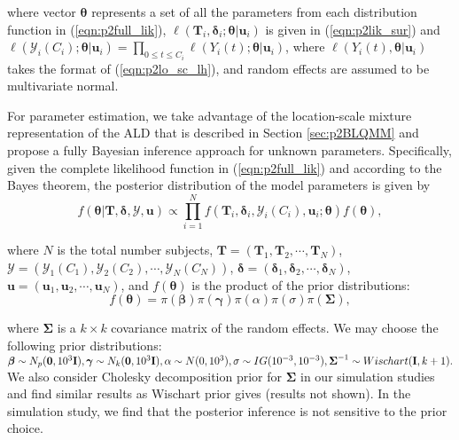 \noindent where vector $\boldsymbol{\theta}$ represents a set of all the parameters from each distribution function in (\ref{eqn:p2full_lik}),  $\ell(\boldsymbol{T}_i, \boldsymbol{\delta}_i; \boldsymbol{\theta}|\boldsymbol{u}_i)$ is given in (\ref{eqn:p2lik_sur}) and $\ell(\mathcal{Y}_{i}(C_i); \boldsymbol{\theta}|\boldsymbol{u}_i)=\prod_{0\le t\le C_i}\ell(Y_{i}(t); \boldsymbol{\theta}|\boldsymbol{u}_i)$, where $\ell(Y_{i}(t), \boldsymbol{\theta}|\boldsymbol{u}_i)$ takes the format of (\ref{eqn:p2lo_sc_lh}), and random effects are assumed to be multivariate normal.

For parameter estimation, we take advantage of the location-scale mixture representation of the ALD that is described in Section \ref{sec:p2BLQMM} and propose a fully Bayesian inference approach for unknown parameters. Specifically, given the complete likelihood function in (\ref{eqn:p2full_lik}) and according to the Bayes theorem, the posterior distribution of the model parameters is given by
\begin{equation}\label{eqn:p2posterior}
f(\boldsymbol{\theta}|\boldsymbol{T}, \boldsymbol{\delta}, \bm{\mathcal{Y}}, \boldsymbol{u})\propto \prod_{i=1}^N f(\boldsymbol{T}_i, \boldsymbol{\delta}_i, \mathcal{Y}_{i}(C_i), \boldsymbol{u}_i;\boldsymbol{\theta}) f(\boldsymbol{\theta}),
\end{equation}

\noindent where $N$ is the total number subjects, $\boldsymbol{T}=(\boldsymbol{T}_1, \boldsymbol{T}_2, \cdots, \boldsymbol{T}_N)$, $\bm{\mathcal{Y}}=(\mathcal{Y}_{1}(C_1), \mathcal{Y}_{2}(C_2), \cdots, \mathcal{Y}_{N}(C_N))$, $\boldsymbol{\delta} =(\boldsymbol{\delta}_1, \boldsymbol{\delta}_2, \cdots, \boldsymbol{\delta}_N)$, $\boldsymbol{u}=(\boldsymbol{u}_1, \boldsymbol{u}_2, \cdots, \boldsymbol{u}_N)$, and $f(\boldsymbol{\theta})$ is the product of the prior distributions:
\[f(\boldsymbol{\theta})=\pi(\boldsymbol{\beta})\pi(\boldsymbol{\gamma})\pi(\alpha)\pi(\sigma)\pi(\boldsymbol{\Sigma}),\]

\noindent where $\boldsymbol{\Sigma}$ is a $k\times k$ covariance matrix of the random effects. We may choose the following prior distributions:
$\boldsymbol{\beta} \sim N_p({\boldsymbol 0}, 10^3{\bf I}), \boldsymbol{\gamma} \sim N_k({\boldsymbol 0}, 10^3{\bf I}), \alpha\sim N(0, 10^3), \sigma\sim IG(10^{-3}, 10^{-3}), \boldsymbol{\Sigma}^{-1}\sim Wischart({\bf I}, k+1). $
We also consider Cholesky decomposition prior for $\boldsymbol{\Sigma}$ in our simulation studies and find similar results as Wischart prior gives (results not shown). In the simulation study, we find that the posterior inference is not sensitive to the prior choice.

